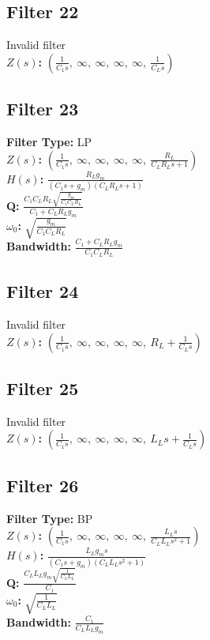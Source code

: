 \documentclass{article}
\begin{document}
\subsection*{Filter 22}
Invalid filter \\ 
\textbf{$Z(s)$:} $\left( \frac{1}{C_{1} s}, \  \infty, \  \infty, \  \infty, \  \infty, \  \frac{1}{C_{L} s}\right)$ \\ 
\subsection*{Filter 23}
\textbf{Filter Type:} LP \\ 
\textbf{$Z(s)$:} $\left( \frac{1}{C_{1} s}, \  \infty, \  \infty, \  \infty, \  \infty, \  \frac{R_{L}}{C_{L} R_{L} s + 1}\right)$ \\ 
\textbf{$H(s)$:} $\frac{R_{L} g_{m}}{\left(C_{1} s + g_{m}\right) \left(C_{L} R_{L} s + 1\right)}$ \\ 
\textbf{Q:} $\frac{C_{1} C_{L} R_{L} \sqrt{\frac{g_{m}}{C_{1} C_{L} R_{L}}}}{C_{1} + C_{L} R_{L} g_{m}}$ \\ 
\textbf{$\omega_0$:} $\sqrt{\frac{g_{m}}{C_{1} C_{L} R_{L}}}$ \\ 
\textbf{Bandwidth:} $\frac{C_{1} + C_{L} R_{L} g_{m}}{C_{1} C_{L} R_{L}}$ \\ 
\subsection*{Filter 24}
Invalid filter \\ 
\textbf{$Z(s)$:} $\left( \frac{1}{C_{1} s}, \  \infty, \  \infty, \  \infty, \  \infty, \  R_{L} + \frac{1}{C_{L} s}\right)$ \\ 
\subsection*{Filter 25}
Invalid filter \\ 
\textbf{$Z(s)$:} $\left( \frac{1}{C_{1} s}, \  \infty, \  \infty, \  \infty, \  \infty, \  L_{L} s + \frac{1}{C_{L} s}\right)$ \\ 
\subsection*{Filter 26}
\textbf{Filter Type:} BP \\ 
\textbf{$Z(s)$:} $\left( \frac{1}{C_{1} s}, \  \infty, \  \infty, \  \infty, \  \infty, \  \frac{L_{L} s}{C_{L} L_{L} s^{2} + 1}\right)$ \\ 
\textbf{$H(s)$:} $\frac{L_{L} g_{m} s}{\left(C_{1} s + g_{m}\right) \left(C_{L} L_{L} s^{2} + 1\right)}$ \\ 
\textbf{Q:} $\frac{C_{L} L_{L} g_{m} \sqrt{\frac{1}{C_{L} L_{L}}}}{C_{1}}$ \\ 
\textbf{$\omega_0$:} $\sqrt{\frac{1}{C_{L} L_{L}}}$ \\ 
\textbf{Bandwidth:} $\frac{C_{1}}{C_{L} L_{L} g_{m}}$ \\ 
\end{document}
